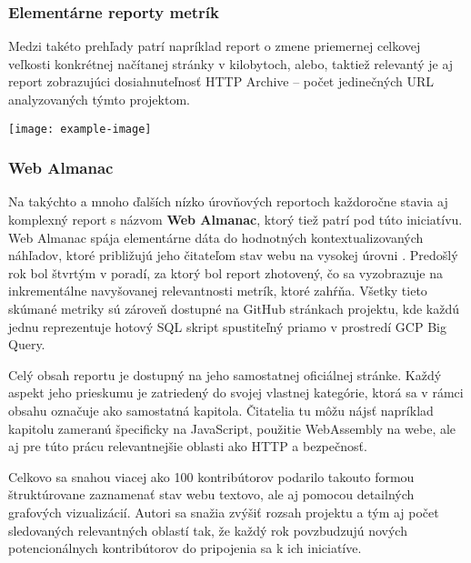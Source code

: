 \subsubsection{Elementárne reporty metrík}
Medzi takéto prehľady patrí napríklad report o zmene priemernej celkovej veľkosti konkrétnej načítanej stránky v kilobytoch, alebo, taktiež relevantý je aj report zobrazujúci dosiahnuteľnosť HTTP Archive -- počet jedinečných URL analyzovaných týmto projektom.

\begin{center}
\noindent\texttt{[image: example-image]}    
\end{center}

\pagebreak

\subsubsection{Web Almanac}
Na takýchto a mnoho ďalších nízko úrovňových reportoch každoročne stavia aj komplexný report s názvom \textbf{Web Almanac}, ktorý tiež patrí pod túto iniciatívu.
Web Almanac spája elementárne dáta do hodnotných kontextualizovaných náhľadov, ktoré približujú jeho čitateľom stav webu na vysokej úrovni \cite{httparchive-methodology}.
Predošlý rok bol štvrtým v poradí, za ktorý bol report zhotovený, čo sa vyzobrazuje na inkrementálne navyšovanej relevantnosti metrík, ktoré zahŕňa. 
Všetky tieto skúmané metriky sú zároveň dostupné na GitHub stránkach projektu, kde každú jednu reprezentuje hotový SQL skript spustiteľný priamo v prostredí GCP Big Query.


Celý obsah reportu je dostupný na jeho samostatnej oficiálnej stránke. 
Každý aspekt jeho prieskumu je zatriedený do svojej vlastnej kategórie, ktorá sa v rámci obsahu označuje ako samostatná kapitola.
Čitatelia tu môžu nájsť napríklad kapitolu zameranú špecificky na JavaScript, použitie WebAssembly na webe, ale aj pre túto prácu relevantnejšie oblasti ako HTTP a bezpečnosť.

Celkovo sa snahou viacej ako 100 kontribútorov podarilo takouto formou štruktúrovane zaznamenať stav webu textovo, ale aj pomocou detailných grafových vizualizácií.
Autori sa snažia zvýšiť rozsah projektu a tým aj počet sledovaných relevantných oblastí tak, že každý rok povzbudzujú nových potencionálnych kontribútorov do pripojenia sa k ich iniciatíve. 

